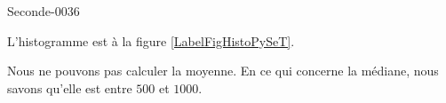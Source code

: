 
\begin{corrige}{Seconde-0036}

L'histogramme est à la figure \ref{LabelFigHistoPySeT}.
\newcommand{\CaptionFigHistoPySeT}{L'histogramme de la question \ref{exoSeconde-0036}.}


Nous ne pouvons pas calculer la moyenne. En ce qui concerne la médiane, nous savons qu'elle est entre \( 500\) et \( 1000\).

\end{corrige}
